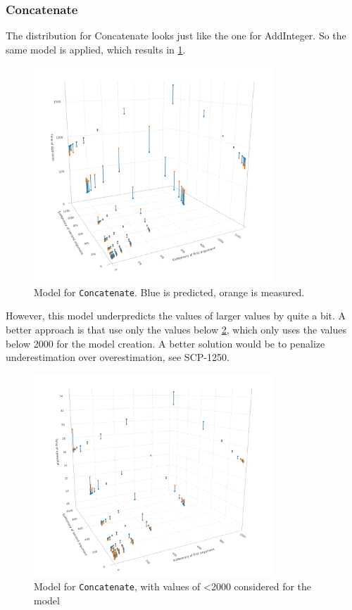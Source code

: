 \documentclass[a4paper]{article}
\begin{document}
\subsubsection*{Concatenate}

The distribution for Concatenate looks just like the one for AddInteger. So the
same model is applied, which results in \ref{fig:ConcatenateFullModel}.

\begin{figure}
\centering
  \includegraphics[width=0.8\textwidth]{figures/ConcatenateFullModel.png}
  \caption{Model for \texttt{Concatenate}. Blue is predicted, orange is measured.}
  \label{fig:ConcatenateFullModel}
\end{figure}

However, this model underpredicts the values of larger values by quite a bit. A
better approach is that use only the values below
\ref{fig:ConcatenateSmallModel}, which only uses the values below 2000 for the
model creation. A better solution would be to penalize underestimation over
overestimation, see SCP-1250.

\begin{figure}
\centering
  \includegraphics[width=0.8\textwidth]{figures/ConcatenateSmallModel.png}
  \caption{Model for \texttt{Concatenate}, with values of <2000 considered for the model}
  \label{fig:ConcatenateSmallModel}
\end{figure}
\end{document}
